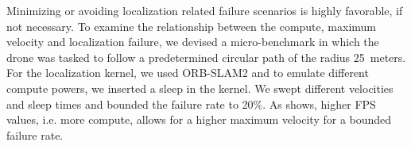 Minimizing or avoiding localization related failure scenarios is highly favorable, if not necessary. To examine the relationship between the compute, maximum velocity and localization failure, we devised a micro-benchmark in which the drone was tasked to follow a predetermined circular path of the radius 25~meters. For the localization kernel, we used ORB-SLAM2 and to emulate different compute powers, we inserted a sleep in the kernel. We swept different velocities and sleep times and bounded the failure rate to 20\%. As  shows, higher FPS values, i.e. more compute, allows for a higher maximum velocity for a bounded failure rate. 

